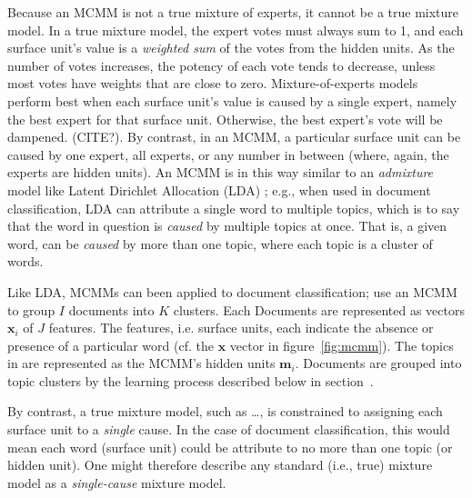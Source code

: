 Because an \ac{MCMM} is not a true mixture of experts, it cannot be a true mixture model. In a true mixture model, the expert votes must always sum to 1, and each surface unit's value is a \emph{weighted sum} of the votes from the hidden units. As the number of votes increases, the potency of each vote tends to decrease, unless most votes have weights that are close to zero. Mixture-of-experts models perform best when each surface unit's value is caused by a single expert, namely the best expert for that surface unit. Otherwise, the best expert's vote will be dampened. (CITE?). By contrast, in an \ac{MCMM}, a particular surface unit can be caused by one expert, all experts, or any number in between (where, again, the experts are hidden units).
An \ac{MCMM} is in this way similar to an \emph{admixture} model like Latent Dirichlet Allocation (LDA) \citep{blei-et-al:2003}; e.g., 
when used in document classification, LDA %
can attribute a single word to multiple topics, %
which is to say that the word in question is \emph{caused} by multiple topics at once.
That is, a given word, %
can be \emph{caused} by more than one topic, 
where each topic is a cluster of words.

Like LDA, MCMMs can been applied to document classification; \cite{sahami-et-al:96} use an \ac{MCMM} to group $I$ documents into $K$ clusters. Each Documents are represented as vectors $\textbf{x}_i$ of $J$ features. The features, i.e. surface units, each indicate the absence or presence of a particular word (cf. the $\textbf{x}$ vector in figure~\ref{fig:mcmm}). The topics in \cite{sahami-et-al:96} are represented as the MCMM's hidden units $\textbf{m}_i$. Documents are grouped into topic clusters by the learning process described below in section~\label{sec:mcmm:learning}.

By contrast, a true mixture model, such as \dots, is constrained to assigning each surface unit to a \emph{single} cause. In the case of 
document classification, this would mean each word (surface unit) could be attribute to no more than
one topic (or hidden unit). One might therefore describe any standard (i.e., true) 
mixture model as a \emph{single-cause} mixture model. 


